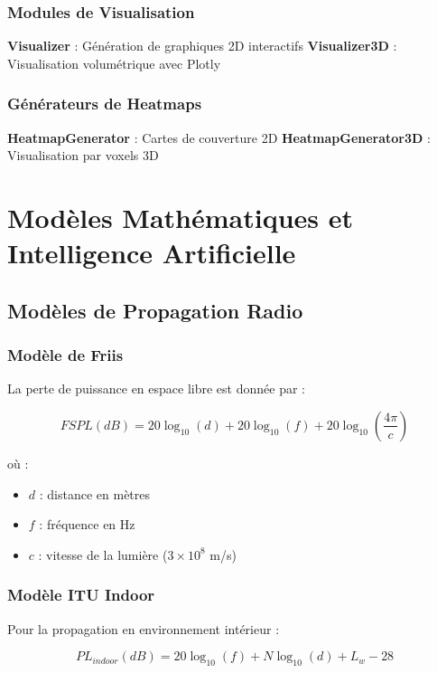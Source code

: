 \documentclass[12pt,a4paper]{article}
\begin{document}
\subsubsection{Modules de Visualisation}
\textbf{Visualizer} : Génération de graphiques 2D interactifs
\textbf{Visualizer3D} : Visualisation volumétrique avec Plotly

\subsubsection{Générateurs de Heatmaps}
\textbf{HeatmapGenerator} : Cartes de couverture 2D
\textbf{HeatmapGenerator3D} : Visualisation par voxels 3D

\section{Modèles Mathématiques et Intelligence Artificielle}

\subsection{Modèles de Propagation Radio}

\subsubsection{Modèle de Friis}
La perte de puissance en espace libre est donnée par :

\begin{equation}
FSPL(dB) = 20\log_{10}(d) + 20\log_{10}(f) + 20\log_{10}\left(\frac{4\pi}{c}\right)
\end{equation}

où :
\begin{itemize}
    \item $d$ : distance en mètres
    \item $f$ : fréquence en Hz
    \item $c$ : vitesse de la lumière ($3 \times 10^8$ m/s)
\end{itemize}

\subsubsection{Modèle ITU Indoor}
Pour la propagation en environnement intérieur :

\begin{equation}
PL_{indoor}(dB) = 20\log_{10}(f) + N\log_{10}(d) + L_{w} - 28
\end{equation}
\end{document}
